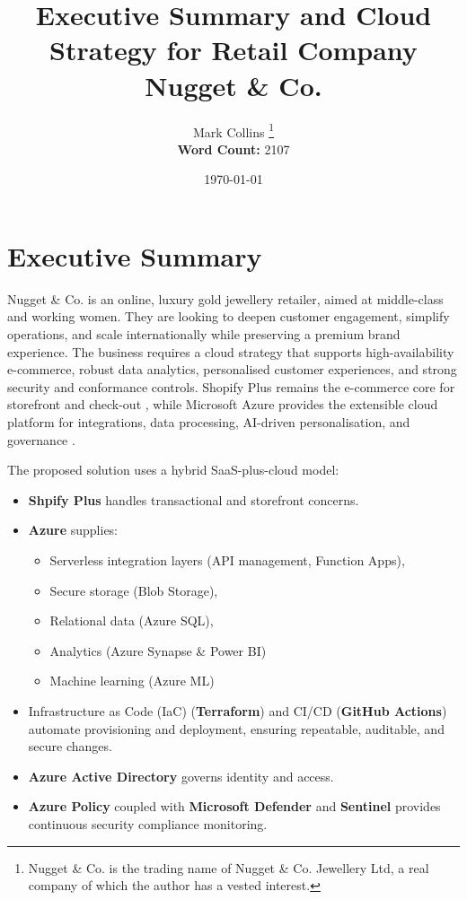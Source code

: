 \documentclass[12pt, a4paper, twoside]{article} %
\title{Executive Summary and Cloud Strategy for Retail Company Nugget \& Co.}
\author{Mark Collins \thanks{Nugget \& Co. is the trading name of Nugget \& Co. Jewellery Ltd, a real company of which the author has a vested interest.} \\ \textbf{Word Count:} 2107}
\date{\today}
\begin{document}
\maketitle

\section{Executive Summary}
Nugget \& Co. \citep{nugget2025} is an online, luxury gold jewellery retailer, aimed at middle-class and working women.  They are looking to deepen customer engagement, simplify operations, and scale internationally while preserving a premium brand experience. The business requires a cloud strategy that supports high-availability e-commerce, robust data analytics, personalised customer experiences, and strong security and conformance controls. Shopify Plus remains the e-commerce core for storefront and check-out \citep{aldea2018}, while Microsoft Azure provides the extensible cloud platform for integrations, data processing, AI-driven personalisation, and governance \citep{alkhatib2025, altemimi2022, perumal2025}. 

The proposed solution uses a hybrid SaaS-plus-cloud model:
\begin{itemize}
\item \textbf{Shpify Plus} handles transactional and storefront concerns.
\item \textbf{Azure} supplies:
	\begin{itemize}
	\item Serverless integration layers (API management, Function Apps), 
	\item Secure storage (Blob Storage), 
	\item Relational data (Azure SQL),
	\item Analytics (Azure Synapse \& Power BI)
	\item Machine learning (Azure ML)
	\end{itemize}
\item Infrastructure as Code (IaC) (\textbf{Terraform}) and CI/CD (\textbf{GitHub Actions}) automate provisioning and deployment, ensuring repeatable, auditable, and secure changes.
\item \textbf{Azure Active Directory} governs identity and access.
\item \textbf{Azure Policy} coupled with \textbf{Microsoft Defender} and \textbf{Sentinel} provides continuous security compliance monitoring.
\end{itemize}
\end{document}
